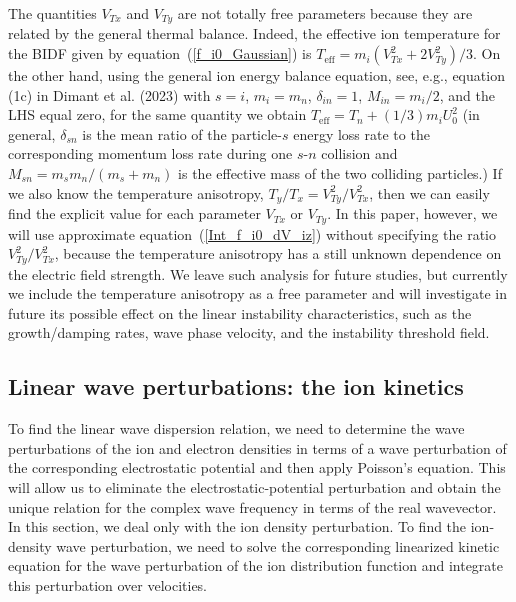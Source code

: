 \documentclass[draft]{agujournal2019}
\begin{document}
The quantities $V_{Tx}$ and $V_{Ty}$ are not totally free parameters because 
they are related by the general thermal balance. Indeed, the effective ion temperature for the BIDF given by equation~(\ref{f_i0_Gaussian}) 
is $T_{\mathrm{eff}}=m_i(V_{Tx}^2+2V_{Ty}^2)/3$. On the other hand, using the general 
ion energy balance equation, 
{ see, e.g., equation (1c) in Dimant et al. (2023) with $s=i$,
$m_{i}=m_{n}$, $\delta_{in}=1$, $M_{in}=m_{i}/2$, and the LHS equal zero, for
the same quantity we obtain $T_{\mathrm{eff}}=T_{n}+(1/3)m_{i}U_{0}^{2}$ (in
general, $\delta_{sn}$ is the mean ratio of the particle-$s$ energy loss rate
to the corresponding momentum loss rate during one $s$-$n$ collision and
$M_{sn}=m_{s}m_{n}/(m_{s}+m_{n})$ is the effective mass of the two colliding
particles.)} 
If we also know the temperature anisotropy,
$T_y/T_x=V_{Ty}^2/V_{Tx}^2$, then we can easily find the explicit value for each parameter $V_{Tx}$ or $V_{Ty}$. 
In this paper, however, we will use approximate equation~(\ref{Int_f_i0_dV_iz}) without
specifying the ratio $V_{Ty}^2/V_{Tx}^2$, because the temperature anisotropy has a still 
unknown dependence on the electric field strength. We leave
such analysis for future studies, but currently we include the temperature anisotropy 
as a free parameter and will investigate in future its possible effect on the linear
instability characteristics, such as the growth/damping rates, wave phase
velocity, and the instability threshold field.

\subsection{Linear wave perturbations: the ion
kinetics\label{Linear wave perturbations: the ion kinetics}}

To find the linear wave dispersion relation, we need to determine the wave
perturbations of the ion and electron densities in terms of a wave perturbation of the corresponding
electrostatic potential and then apply Poisson's equation.
This will allow us to eliminate the electrostatic-potential perturbation and
obtain the unique relation for the complex wave frequency in terms of the real
wavevector. In this section, we deal only with the ion density perturbation. To
find the ion-density wave perturbation, we need to solve the corresponding
linearized kinetic equation for the wave perturbation of the ion distribution
function and integrate this perturbation over velocities. 
\end{document}
